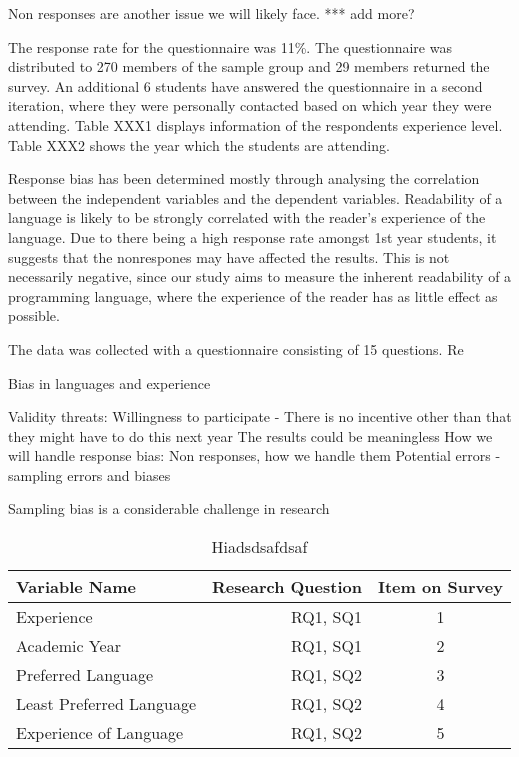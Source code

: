 \documentclass[times, 10pt,twocolumn]{IEEEtran}
\begin{document}
Non responses are another issue we will likely face. *** add more?


The response rate for the questionnaire was 11\%. The questionnaire was distributed to 270 members of the sample group and 29 members returned the survey. An additional 6 students have answered the questionnaire in a second iteration, where they were personally contacted based on which year they were attending. Table XXX1 displays information of the respondents experience level. Table XXX2 shows the year which the students are attending. 
\newline

Response bias has been determined mostly through analysing the correlation between the independent variables and the dependent variables. Readability of a language is likely to be strongly correlated with the reader's experience of the language. Due to there being a high response rate amongst 1st year students, it suggests that the nonrespones may have affected the results. This is not necessarily negative, since our study aims to measure the inherent readability of a programming language, where the experience of the reader has as little effect as possible. 
\newline

The data was collected with a questionnaire consisting of 15 questions.
Re





Bias in languages and experience

  Validity threats:
    Willingness to participate - There is no incentive other than that they might have to do this next year
    The results could be meaningless
    How we will handle response bias:
      Non responses, how we handle them
  Potential errors - sampling errors and biases

  Sampling bias is a considerable challenge in research \cite{easterbrook2008selecting}






\begin{table}[ht]
  \centering
  \begin{tabular}{| l | r | c |}
  	\hline
  	\textbf{Variable Name} & \textbf{Research Question} & \textbf{Item on Survey} \\ \hline
  	Experience & RQ1, SQ1 & 1 \\ \hline
    Academic Year & RQ1, SQ1 & 2 \\ \hline
  	Preferred Language & RQ1, SQ2 & 3 \\ \hline
  	Least Preferred Language & RQ1, SQ2& 4 \\  \hline
  	Experience of Language & RQ1, SQ2 & 5 \\ 
  	\hline
	\end{tabular}
  \caption{ Hiadsdsafdsaf}
\end{table}
\end{document}
